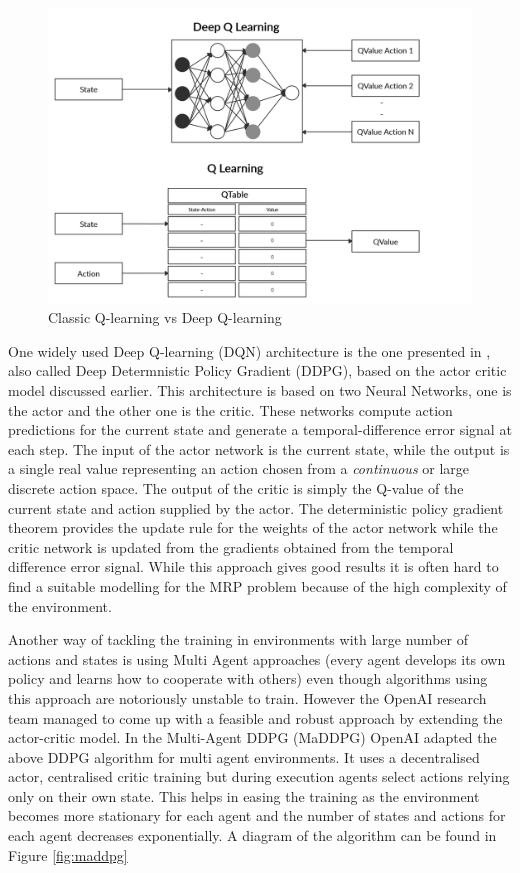 \begin{figure}[!htb]
\centering
\includegraphics[scale=0.19]{Figures/QLearningvsDQN.jpg}
\caption{Classic Q-learning vs Deep Q-learning}
\label{fig:qlearningvsDQN}
\end{figure}

\par One widely used Deep Q-learning (DQN) architecture is the one presented in \cite{dulacarnold2015deep}, also called Deep Determnistic Policy Gradient (DDPG), based on the actor critic model discussed earlier. This architecture is based on two Neural Networks, one is the actor and the other one is the critic. These networks compute action predictions for the current state and generate a temporal-difference error signal at each step. The input of the actor network is the current state, while the output is a single real value representing an action chosen from a \emph{continuous} or large discrete action space. The output of the critic is simply the Q-value of the current state and action supplied by the actor. The deterministic policy gradient theorem \cite{dpgTheorem} provides the update rule for the weights of the actor network while the critic network is updated from the gradients obtained from the temporal difference error signal.
While this approach gives good results it is often hard to find a suitable modelling for the MRP problem because of the high complexity of the environment. \\
\par Another way of tackling the training in environments with large number of actions and states is using Multi Agent approaches (every agent develops its own policy and learns how to cooperate with others) even though algorithms using this approach are notoriously unstable to train. However the OpenAI research team managed to come up with a feasible and robust approach \cite{lowe2017multiagent} by extending the actor-critic model. In the Multi-Agent DDPG (MaDDPG) OpenAI adapted the above DDPG algorithm for multi agent environments. It uses a decentralised actor, centralised critic training but during execution agents select actions relying only on their own state. This helps in easing the training as the environment becomes more stationary for each agent and the number of states and actions for each agent decreases exponentially. A diagram of the algorithm can be found in Figure \ref{fig:maddpg} \cite[Figure-1]{lowe2017multiagent}

